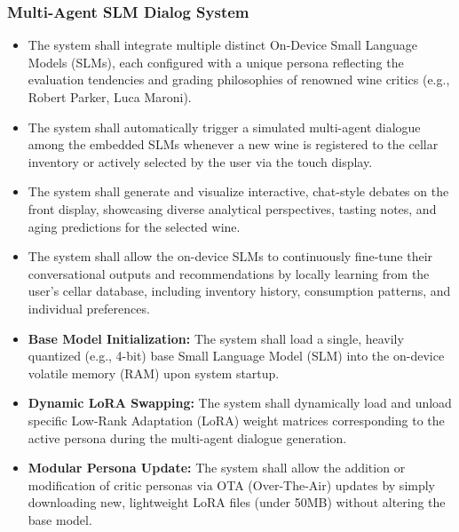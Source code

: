 \documentclass[conference]{IEEEtran}
\begin{document}
\subsubsection{Multi-Agent SLM Dialog System}
\begin{itemize}
    \item The system shall integrate multiple distinct On-Device Small Language Models (SLMs), each configured with a unique persona reflecting the evaluation tendencies and grading philosophies of renowned wine critics (e.g., Robert Parker, Luca Maroni).
    \item The system shall automatically trigger a simulated multi-agent dialogue among the embedded SLMs whenever a new wine is registered to the cellar inventory or actively selected by the user via the touch display.
    \item The system shall generate and visualize interactive, chat-style debates on the front display, showcasing diverse analytical perspectives, tasting notes, and aging predictions for the selected wine.
    \item The system shall allow the on-device SLMs to continuously fine-tune their conversational outputs and recommendations by locally learning from the user's cellar database, including inventory history, consumption patterns, and individual preferences.
    \item \textbf{Base Model Initialization:} The system shall load a single, heavily quantized (e.g., 4-bit) base Small Language Model (SLM) into the on-device volatile memory (RAM) upon system startup.
    \item \textbf{Dynamic LoRA Swapping:} The system shall dynamically load and unload specific Low-Rank Adaptation (LoRA) weight matrices corresponding to the active persona during the multi-agent dialogue generation.
    \item \textbf{Modular Persona Update:} The system shall allow the addition or modification of critic personas via OTA (Over-The-Air) updates by simply downloading new, lightweight LoRA files (under 50MB) without altering the base model.
\end{itemize}
\end{document}
